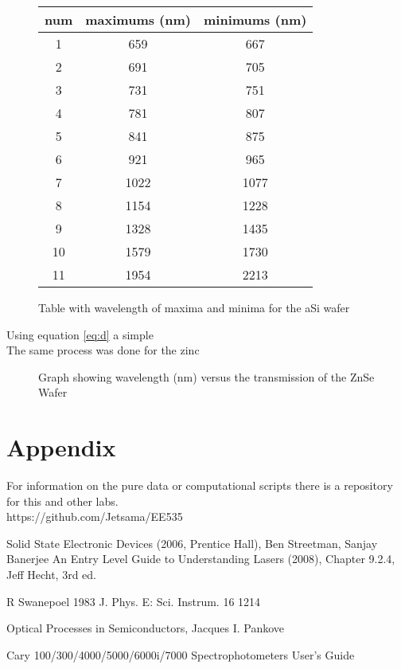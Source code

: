 \documentclass[10pt,a4paper]{article}
\begin{document}
\begin{multicols}{2}
\begin{figure}[H]
\label{AmSiTranTable}
\centering
\begin{tabular}{ |c|c|c| } 
\hline
num & maximums (nm) & minimums (nm)\\
\hline
 1 & 659  & 667\\
 2 & 691  & 705\\
 3 & 731  & 751\\
 4 & 781  & 807\\
 5 & 841  & 875\\
 6 & 921  & 965\\
 7 & 1022 & 1077\\
 8 & 1154 & 1228\\
 9 & 1328 & 1435\\
 10& 1579 & 1730\\
 11& 1954 & 2213\\
\hline
\end{tabular}
\caption{Table with wavelength of maxima and minima for the aSi wafer}
\end{figure}
Using equation \ref{eq:d} a simple \\


The same process was done for the zinc 

\begin{figure}[H]
\label{znsetran}
\caption{Graph showing wavelength (nm) versus the transmission of the ZnSe Wafer }
\end{figure}
    

\section*{Appendix}
For information on the pure data or computational scripts there is a repository for this and other labs. \\
https://github.com/Jetsama/EE535\\
\begin{thebibliography}{9}
 Solid State Electronic Devices (2006, Prentice Hall), Ben Streetman, Sanjay Banerjee
An Entry Level Guide to Understanding Lasers (2008), Chapter 9.2.4, Jeff Hecht, 3rd ed. 

R Swanepoel 1983 J. Phys. E: Sci. Instrum. 16 1214

Optical Processes in Semiconductors, Jacques I. Pankove

Cary 100/300/4000/5000/6000i/7000 Spectrophotometers User's Guide


\end{thebibliography}
\end{multicols}
\end{document}
